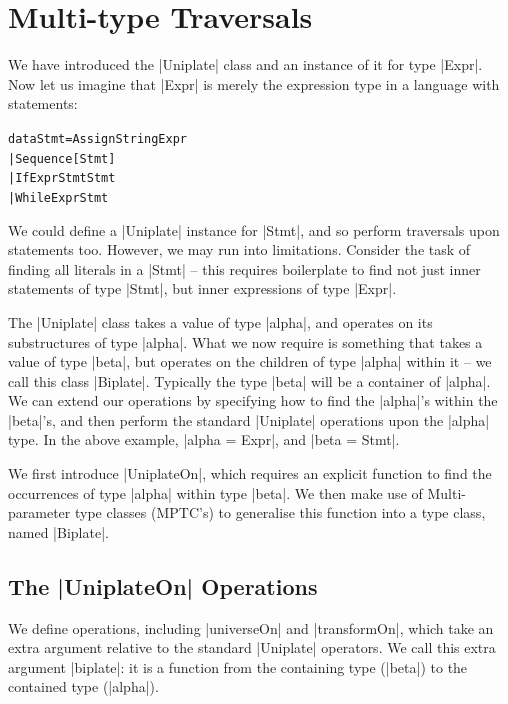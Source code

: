 \documentclass[preprint]{sigplanconf}
\newenvironment{code}{\begin{alltt}\small}{\end{alltt}}
\newcommand{\ignore}{}
\begin{document}
\section{Multi-type Traversals}
\label{sec:use_playex}

We have introduced the |Uniplate| class and an instance of it for type |Expr|. Now let us imagine that |Expr| is merely the expression type in a language with statements:

\begin{code}
data Stmt  =  Assign    String  Expr
           |  Sequence  [Stmt]
           |  If        Expr    Stmt Stmt
           |  While     Expr    Stmt
\end{code}

We could define a |Uniplate| instance for |Stmt|, and so perform traversals upon statements too. However, we may run into limitations. Consider the task of finding all literals in a |Stmt| -- this requires boilerplate to find not just inner statements of type |Stmt|, but inner expressions of type |Expr|.

The |Uniplate| class takes a value of type |alpha|, and operates on its substructures of type |alpha|. What we now require is something that takes a value of type |beta|, but operates on the children of type |alpha| within it -- we call this class |Biplate|. Typically the type |beta| will be a container of |alpha|. We can extend our operations by specifying how to find the |alpha|'s within the |beta|'s, and then perform the standard |Uniplate| operations upon the |alpha| type. In the above example, \ignore|alpha = Expr|, and \ignore|beta = Stmt|.

We first introduce |UniplateOn|, which requires an explicit function to find the occurrences of  type |alpha| within type |beta|. We then make use of Multi-parameter type classes (MPTC's) to generalise this function into a type class, named |Biplate|.

\subsection{The |UniplateOn| Operations}

We define operations, including |universeOn| and |transformOn|, which take an extra argument relative to the standard |Uniplate| operators. We call this extra argument |biplate|: it is a function from the containing type (|beta|) to the contained type (|alpha|).

\end{document}
